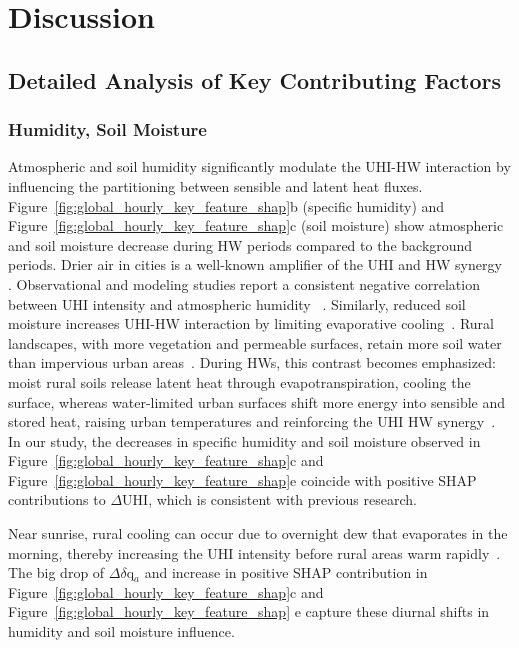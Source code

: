 \section*{Discussion}




\subsection*{Detailed Analysis of Key Contributing Factors}



\subsubsection*{Humidity, Soil Moisture}Atmospheric and soil humidity significantly modulate the UHI-HW interaction by influencing the partitioning between sensible and latent heat fluxes. Figure~\ref{fig:global_hourly_key_feature_shap}b (specific humidity) and Figure~\ref{fig:global_hourly_key_feature_shap}c (soil moisture) show atmospheric and soil moisture decrease during HW periods compared to the background periods. Drier air in cities is a well-known amplifier of the UHI and HW synergy\unskip~\cite{2755510:33598950,2755510:33598924,2755510:33598925,2755510:33598926,2755510:33598952} . Observational and modeling studies report a consistent negative correlation between UHI intensity and atmospheric humidity\unskip~\cite{2755510:33598949,2755510:33598952,2755510:33598937} . Similarly, reduced soil moisture increases UHI-HW interaction by limiting evaporative cooling\unskip~\cite{2755510:33598950,2755510:33598925,2755510:33598926,2755510:33598915}. Rural landscapes, with more vegetation and permeable surfaces, retain more soil water than impervious urban areas\unskip~\cite{2755510:33598915,2755510:33598938}. During HWs, this contrast becomes emphasized: moist rural soils release latent heat through evapotranspiration, cooling the surface, whereas water-limited urban surfaces shift more energy into sensible and stored heat, raising urban temperatures and reinforcing the UHI HW synergy\unskip~\cite{2755510:33598924,2755510:33598925,2755510:33598926,2755510:33598935}. In our study, the decreases in specific humidity and soil moisture observed in Figure~\ref{fig:global_hourly_key_feature_shap}c and Figure~\ref{fig:global_hourly_key_feature_shap}e coincide with positive SHAP contributions to \ensuremath{\Delta }UHI, which is consistent with previous research.

Near sunrise, rural cooling can occur due to overnight dew that evaporates in the morning, thereby increasing the UHI intensity before rural areas warm rapidly\unskip~\cite{2755510:33598926}.  The big drop of \ensuremath{\Delta }\ensuremath{\delta }q\ensuremath{_{a}} and increase in positive SHAP contribution in Figure~\ref{fig:global_hourly_key_feature_shap}c and Figure~\ref{fig:global_hourly_key_feature_shap} e capture these diurnal shifts in humidity and soil moisture influence.

